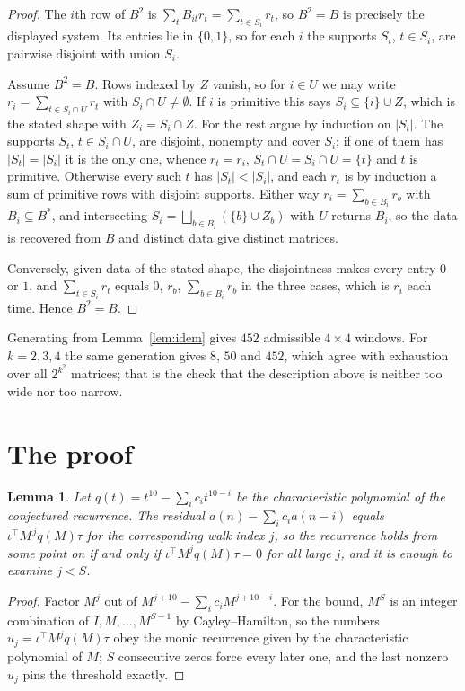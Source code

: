 \documentclass[11pt,a4paper]{article}
\theoremstyle{plain}
\newtheorem{lemma}[theorem]{Lemma}
\theoremstyle{definition}
\begin{document}
\begin{proof}
The $i$th row of $B^2$ is $\sum_t B_{it}r_t=\sum_{t\in S_i}r_t$, so $B^2=B$ is precisely the
displayed system. Its entries lie in $\{0,1\}$, so for each $i$ the supports $S_t$,
$t\in S_i$, are pairwise disjoint with union $S_i$.

Assume $B^2=B$. Rows indexed by $Z$ vanish, so for $i\in U$ we may write
$r_i=\sum_{t\in S_i\cap U}r_t$ with $S_i\cap U\neq\emptyset$. If $i$ is primitive this says
$S_i\subseteq\{i\}\cup Z$, which is the stated shape with $Z_i=S_i\cap Z$. For the rest argue
by induction on $|S_i|$. The supports $S_t$, $t\in S_i\cap U$, are disjoint, nonempty and
cover $S_i$; if one of them has $|S_t|=|S_i|$ it is the only one, whence $r_t=r_i$,
$S_t\cap U=S_i\cap U=\{t\}$ and $t$ is primitive. Otherwise every such $t$ has
$|S_t|<|S_i|$, and each $r_t$ is by induction a sum of primitive rows with disjoint supports.
Either way $r_i=\sum_{b\in B_i}r_b$ with $B_i\subseteq B^{\ast}$, and intersecting
$S_i=\bigsqcup_{b\in B_i}(\{b\}\cup Z_b)$ with $U$ returns $B_i$, so the data is recovered
from $B$ and distinct data give distinct matrices.

Conversely, given data of the stated shape, the disjointness makes every entry $0$ or $1$, and
$\sum_{t\in S_i}r_t$ equals $0$, $r_b$, $\sum_{b\in B_i}r_b$ in the three cases, which is
$r_i$ each time. Hence $B^2=B$.
\end{proof}

Generating from Lemma~\ref{lem:idem} gives $452$ admissible $4\times4$ windows. For
$k=2,3,4$ the same generation gives $8$, $50$ and $452$, which agree with exhaustion over all
$2^{k^2}$ matrices; that is the check that the description above is neither too wide nor too
narrow.

\section{The proof}

\begin{lemma}\label{lem:crit}
Let $q(t)=t^{10}-\sum_i c_it^{10-i}$ be the characteristic polynomial of the
conjectured recurrence. The residual $a(n)-\sum_ic_ia(n-i)$ equals
$\iota^{\!\top}M^{\,j}q(M)\tau$ for the corresponding walk index $j$, so the recurrence
holds from some point on if and only if $\iota^{\!\top}M^{j}q(M)\tau=0$ for all large $j$,
and it is enough to examine $j<S$.
\end{lemma}

\begin{proof}
Factor $M^{j}$ out of $M^{j+10}-\sum_ic_iM^{j+10-i}$. For the bound, $M^{S}$
is an integer combination of $I,M,\dots,M^{S-1}$ by Cayley--Hamilton, so the numbers
$u_j=\iota^{\!\top}M^{j}q(M)\tau$ obey the monic recurrence given by the characteristic
polynomial of $M$; $S$ consecutive zeros force every later one, and the last nonzero $u_j$
pins the threshold exactly.
\end{proof}
\end{document}

